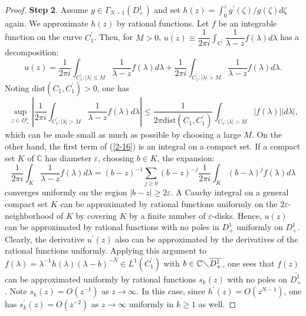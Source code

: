 \documentclass[10pt,a4paper]{amsart}
\begin{document}
\begin{proof}
\textbf{Step} \textbf{2}. Assume $g\in\Gamma_{N-1}\left(  D_{+}^{1}\right)  $
and set $h\left(  z\right)  =\int_{0}^{z}g^{\prime}\left(  \zeta\right)
/g\left(  \zeta\right)  d\zeta$ again. We approximate $h(z)$ by rational
functions. Let $f$ be an integrable function on the curve $C_{1}^{\prime}$.
Then, for $M>0$, $u\left(  z\right)  \equiv\dfrac{1}{2\pi i}\int_{C^{\prime}%
}\dfrac{1}{\lambda-z}f\left(  \lambda\right)  d\lambda$ has a decomposition:%
\begin{equation}
u\left(  z\right)  =\dfrac{1}{2\pi i}\int_{C_{1}^{\prime}:\left\vert
\lambda\right\vert \leq M}\dfrac{1}{\lambda-z}f\left(  \lambda\right)
d\lambda+\dfrac{1}{2\pi i}\int_{C_{1}^{\prime}:\left\vert \lambda\right\vert
>M}\dfrac{1}{\lambda-z}f\left(  \lambda\right)  d\lambda\text{.} \label{2-16}%
\end{equation}
Noting $\mathrm{dist}\left(  C_{1},C_{1}^{\prime}\right)  >0$, one has%
\[
\sup_{z\in D_{+}^{1}}\left\vert \dfrac{1}{2\pi i}\int_{C_{1}^{\prime
}:\left\vert \lambda\right\vert >M}\dfrac{1}{\lambda-z}f\left(  \lambda
\right)  d\lambda\right\vert \leq\dfrac{1}{2\pi\mathrm{dist}\left(
C_{1},C_{1}^{\prime}\right)  }\int_{C_{1}^{\prime}:\left\vert \lambda
\right\vert >M}\left\vert f\left(  \lambda\right)  \right\vert \left\vert
d\lambda\right\vert \text{,}%
\]
which can be made small as much as possible by choosing a large $M$. On the
other hand, the first term of (\ref{2-16}) is an integral on a compact set. If
a compact set $K$ of $\mathbb{C}$ has diameter $\varepsilon$, choosing $b\in
K$, the expansion:%
\[
\dfrac{1}{2\pi i}\int_{K}\dfrac{1}{\lambda-z}f\left(  \lambda\right)
d\lambda=\left(  b-z\right)  ^{-1}\sum_{j\geq0}\left(  b-z\right)  ^{-j}%
\dfrac{1}{2\pi i}\int_{K}\left(  b-\lambda\right)  ^{j}f\left(  \lambda
\right)  d\lambda
\]
converges uniformly on the region $\left\vert b-z\right\vert \geq2\varepsilon
$. A Cauchy integral on a general compact set $K$ can be approximated by
rational functions uniformly on the $2\varepsilon$-neighborhood of $K$ by
covering $K$ by a finite number of $\varepsilon$-disks. Hence, $u(z)$ can be
approximated by rational functions with no poles in $D_{+}^{1}$ uniformly on
$D_{+}^{1}$. Clearly, the derivative $u^{\prime}(z)$ also can be approximated
by the derivatives of the rational functions uniformly. Applying this argument
to $f(\lambda)=\lambda^{-1}h\left(  \lambda\right)  \left(  \lambda-b\right)
^{-N}\in L^{1}\left(  C_{1}^{\prime}\right)  $ with $b\in\mathbb{C}%
\diagdown\overline{D_{+}^{1}}$, one sees that $f\left(  z\right)  $ can be
approximated uniformly by rational functions $s_{k}(z)$ with no poles on
$\overline{D_{+}^{1}}$. Note $s_{k}(z)=O\left(  z^{-1}\right)  $ as
$z\rightarrow\infty$. In this case, since $h^{\prime}\left(  z\right)
=O\left(  z^{N-1}\right)  $, one has $s_{k}^{\prime}(z)=O\left(
z^{-2}\right)  $ as $z\rightarrow\infty$ uniformly in $k\geq1$ as well.


\end{proof}
\end{document}
